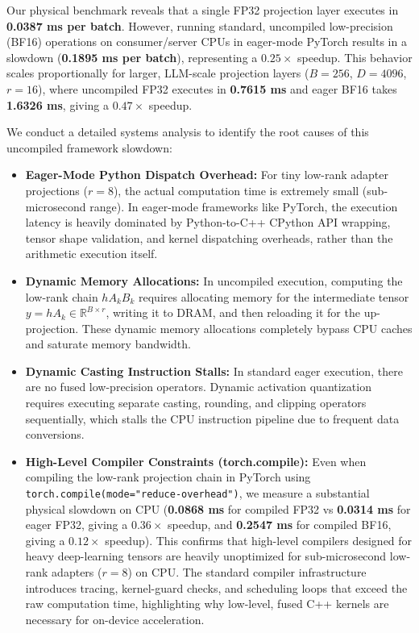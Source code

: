 Our physical benchmark reveals that a single FP32 projection layer executes in \textbf{0.0387 ms per batch}. However, running standard, uncompiled low-precision (BF16) operations on consumer/server CPUs in eager-mode PyTorch results in a slowdown (\textbf{0.1895 ms per batch}), representing a $0.25\times$ speedup. This behavior scales proportionally for larger, LLM-scale projection layers ($B=256$, $D=4096$, $r=16$), where uncompiled FP32 executes in \textbf{0.7615 ms} and eager BF16 takes \textbf{1.6326 ms}, giving a $0.47\times$ speedup. 

We conduct a detailed systems analysis to identify the root causes of this uncompiled framework slowdown:
\begin{itemize}
  \item \textbf{Eager-Mode Python Dispatch Overhead:} For tiny low-rank adapter projections ($r=8$), the actual computation time is extremely small (sub-microsecond range). In eager-mode frameworks like PyTorch, the execution latency is heavily dominated by Python-to-C++ CPython API wrapping, tensor shape validation, and kernel dispatching overheads, rather than the arithmetic execution itself.
  \item \textbf{Dynamic Memory Allocations:} In uncompiled execution, computing the low-rank chain $h A_k B_k$ requires allocating memory for the intermediate tensor $y = h A_k \in \mathbb{R}^{B \times r}$, writing it to DRAM, and then reloading it for the up-projection. These dynamic memory allocations completely bypass CPU caches and saturate memory bandwidth.
  \item \textbf{Dynamic Casting Instruction Stalls:} In standard eager execution, there are no fused low-precision operators. Dynamic activation quantization requires executing separate casting, rounding, and clipping operators sequentially, which stalls the CPU instruction pipeline due to frequent data conversions.
  \item \textbf{High-Level Compiler Constraints (torch.compile):} Even when compiling the low-rank projection chain in PyTorch using \texttt{torch.compile(mode="reduce-overhead")}, we measure a substantial physical slowdown on CPU (\textbf{0.0868 ms} for compiled FP32 vs \textbf{0.0314 ms} for eager FP32, giving a $0.36\times$ speedup, and \textbf{0.2547 ms} for compiled BF16, giving a $0.12\times$ speedup). This confirms that high-level compilers designed for heavy deep-learning tensors are heavily unoptimized for sub-microsecond low-rank adapters ($r=8$) on CPU. The standard compiler infrastructure introduces tracing, kernel-guard checks, and scheduling loops that exceed the raw computation time, highlighting why low-level, fused C++ kernels are necessary for on-device acceleration.
\end{itemize}

